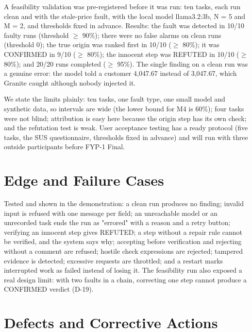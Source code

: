 \documentclass{fast-nuces-bs}
\begin{document}
A feasibility validation was pre-registered before it was run: ten tasks, each run clean and with the stale-price fault, with the local model llama3.2:3b, N = 5 and M = 2, and thresholds fixed in advance. Results: the fault was detected in 10/10 faulty runs (threshold $\geq$ 90\%); there were no false alarms on clean runs (threshold 0); the true origin was ranked first in 10/10 ($\geq$ 80\%); it was CONFIRMED in 9/10 ($\geq$ 80\%); the innocent step was REFUTED in 10/10 ($\geq$ 80\%); and 20/20 runs completed ($\geq$ 95\%). The single finding on a clean run was a genuine error: the model told a customer 4,047.67 instead of 3,047.67, which Granite caught although nobody injected it.

We state the limits plainly: ten tasks, one fault type, one small model and synthetic data, so intervals are wide (the lower bound for M4 is 60\%); four tasks were not blind; attribution is easy here because the origin step has its own check; and the refutation test is weak. User acceptance testing has a ready protocol (five tasks, the SUS questionnaire, thresholds fixed in advance) and will run with three outside participants before FYP-1 Final.

\section{Edge and Failure Cases}

Tested and shown in the demonstration: a clean run produces no finding; invalid input is refused with one message per field; an unreachable model or an unrecorded task ends the run as "errored" with a reason and a retry button; verifying an innocent step gives REFUTED; a step without a repair rule cannot be verified, and the system says why; accepting before verification and rejecting without a comment are refused; hostile check expressions are rejected; tampered evidence is detected; excessive requests are throttled; and a restart marks interrupted work as failed instead of losing it. The feasibility run also exposed a real design limit: with two faults in a chain, correcting one step cannot produce a CONFIRMED verdict (D-19).

\section{Defects and Corrective Actions}
\end{document}
